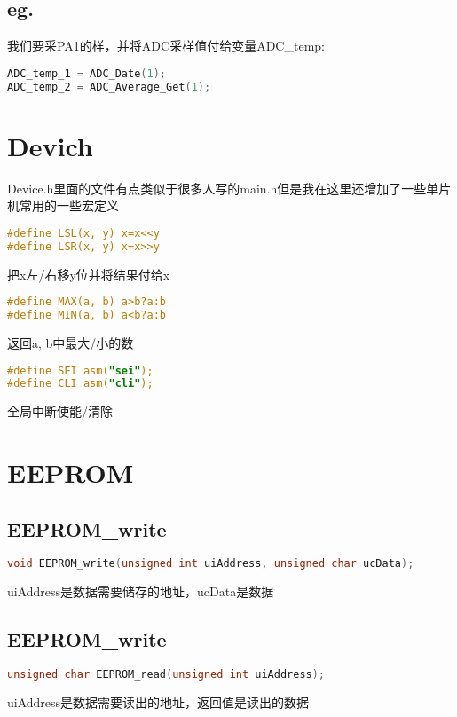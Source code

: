 \documentclass{report}
\begin{document}
        \subsection{eg.}
            我们要采PA1的样，并将ADC采样值付给变量ADC\_temp:
            \begin{lstlisting}[language=C]
ADC_temp_1 = ADC_Date(1);
ADC_temp_2 = ADC_Average_Get(1);
            \end{lstlisting}

    \section{Devich}
        Device.h里面的文件有点类似于很多人写的main.h但是我在这里还增加了一些单片机常用的一些宏定义
        \begin{lstlisting}[language=C]
#define LSL(x, y) x=x<<y
#define LSR(x, y) x=x>>y
        \end{lstlisting}
        把x左/右移y位并将结果付给x

        \begin{lstlisting}[language=C]
#define MAX(a, b) a>b?a:b
#define MIN(a, b) a<b?a:b
        \end{lstlisting}
        返回a, b中最大/小的数

        \begin{lstlisting}[language=C]
#define SEI asm("sei");
#define CLI asm("cli");
        \end{lstlisting}
        全局中断使能/清除

    \section{EEPROM}
        \subsection{EEPROM\_write}
            \begin{lstlisting}[language=C]
void EEPROM_write(unsigned int uiAddress, unsigned char ucData);
            \end{lstlisting}
            uiAddress是数据需要储存的地址，ucData是数据

        \subsection{EEPROM\_write}
            \begin{lstlisting}[language=C]
unsigned char EEPROM_read(unsigned int uiAddress);
            \end{lstlisting}
            uiAddress是数据需要读出的地址，返回值是读出的数据
            
\end{document}

